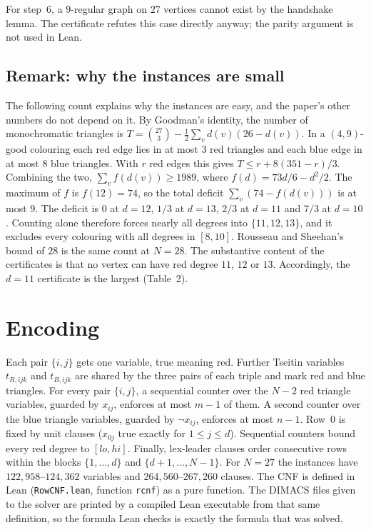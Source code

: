 \documentclass[11pt]{amsart}
\theoremstyle{definition}
\begin{document}
For step~6, a $9$-regular graph on $27$ vertices cannot exist by the
handshake lemma. The certificate refutes this case directly anyway;
the parity argument is not used in Lean.

\subsection*{Remark: why the instances are small}

The following count explains why the instances are easy, and the
paper's other numbers do not depend on it. By Goodman's identity, the
number of monochromatic triangles is
$T=\binom{27}{3}-\frac12\sum_v d(v)(26-d(v))$. In a $(4,9)$-good
colouring each red edge lies in at most $3$ red triangles and each
blue edge in at most $8$ blue triangles. With $r$ red edges this gives
$T\le r+8(351-r)/3$. Combining the two, $\sum_v f(d(v))\ge 1989$,
where $f(d)=73d/6-d^2/2$. The maximum of $f$ is $f(12)=74$, so the
total deficit $\sum_v(74-f(d(v)))$ is at most $9$. The deficit is $0$
at $d=12$, $1/3$ at $d=13$, $2/3$ at $d=11$ and $7/3$ at $d=10$.
Counting alone therefore forces nearly all degrees into
$\{11,12,13\}$, and it excludes every colouring with all degrees in
$[8,10]$. Rousseau and Sheehan's bound of $28$ is the same count at
$N=28$. The substantive content of the certificates is that no vertex
can have red degree $11$, $12$ or $13$. Accordingly, the $d=11$
certificate is the largest (Table~2).

\section{Encoding}

Each pair $\{i,j\}$ gets one variable, true meaning red. Further
Tseitin variables $t_{R,ijk}$ and $t_{B,ijk}$ are shared by the three
pairs of each triple and mark red and blue triangles. For every pair
$\{i,j\}$, a sequential counter \cite{Sin05} over the $N-2$ red
triangle variables, guarded by $x_{ij}$, enforces at most $m-1$ of
them. A second counter over the blue triangle variables, guarded by
$\neg x_{ij}$, enforces at most $n-1$. Row~0 is fixed by unit clauses
($x_{0j}$ true exactly for $1\le j\le d$). Sequential counters bound
every red degree to $[lo,hi]$. Finally, lex-leader clauses order
consecutive rows within the blocks $\{1,\dots,d\}$ and
$\{d+1,\dots,N-1\}$. For $N=27$ the instances have
$122{,}958$--$124{,}362$ variables and $264{,}560$--$267{,}260$
clauses. The CNF is defined in Lean (\texttt{RowCNF.lean}, function
\texttt{rcnf}) as a pure function. The DIMACS files given to the
solver are printed by a compiled Lean executable from that same
definition, so the formula Lean checks is exactly the formula that was
solved.
\end{document}
